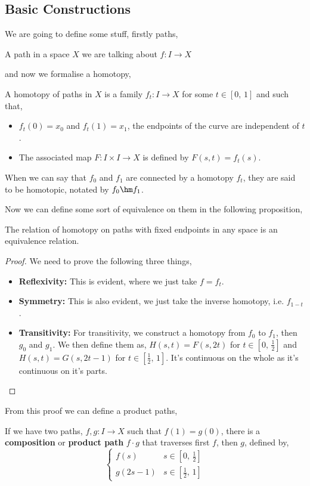 \subsection{Basic Constructions}
We are going to define some stuff, firstly paths,
\begin{ndefi}[Path]
  A path in a space $X$ we are talking about $f : I \to X$
\end{ndefi}
and now we formalise a homotopy,
\begin{ndefi}
  A homotopy of paths in $X$ is a family $f_t : I \to X$ for some $t \in [0,\,1]$ and such that,
  \begin{itemize}
    \item $f_t(0) = x_0$ and $f_t(1) = x_1$, the endpoints of the curve are independent of $t$.
    \item The associated map $F : I \times I \to X$ is defined by $F(s, t) = f_t(s)$.
  \end{itemize}
  When we can say that $f_0$ and $f_1$ are connected by a homotopy $f_t$, they are said to be homotopic, notated by $f_0 \hm f_1$.
\end{ndefi}

Now we can define some sort of equivalence on them in the following proposition,
\begin{nprop}
  The relation of homotopy on paths with fixed endpoints in any space is an equivalence relation.
\end{nprop}
\begin{proof}
  We need to prove the following three things,
  \begin{itemize}
    \item \textbf{Reflexivity: }This is evident, where we just take $f = f_t$.
    \item \textbf{Symmetry: }This is also evident, we just take the inverse homotopy, i.e. $f_{1-t}$.
    \item \textbf{Transitivity: }For transitivity, we construct a homotopy from $f_0$ to $f_1$, then $g_0$ and $g_1$. We then define them as, $H(s, t) =F(s, 2t)$ for $t \in \left[0,\,\frac{1}{2}\right]$ and $H(s, t) = G(s, 2t-1)$ for $t \in \left[\frac{1}{2},\,1\right]$. It's continuous on the whole as it's continuous on it's parts.
  \end{itemize}
\end{proof}

From this proof we can define a product paths,
\begin{ndefi}
  If we have two paths, $f, g : I \to X$ such that $f(1) = g(0)$, there is a \textbf{composition} or \textbf{product path} $f \cdot g$ that traverses first $f$, then $g$, defined by,
  $$ \begin{cases}
    f(s) & s \in \left[0 ,\, \frac{1}{2}\right]\\
    g(2s-1) & s \in \left[\frac{1}{2},\, 1\right]
  \end{cases} $$
\end{ndefi}

